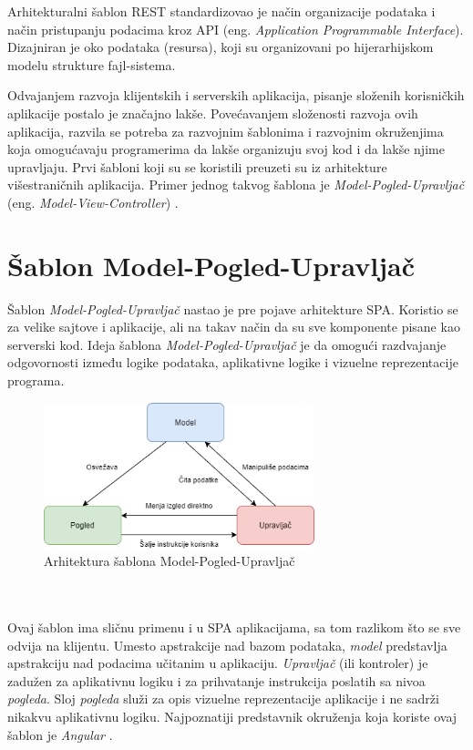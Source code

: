 \documentclass[12pt,oneside]{memoir}
\begin{document}
Arhitekturalni šablon REST standardizovao je način organizacije podataka
i način pristupanju podacima kroz API (eng. \emph{Application Programmable Interface}). 
Dizajniran je oko podataka (resursa), koji su organizovani po hijerarhijskom modelu
strukture fajl-sistema.

Odvajanjem razvoja klijentskih i serverskih aplikacija, pisanje složenih korisničkih aplikacije postalo je značajno lakše.
Povećavanjem složenosti razvoja ovih aplikacija,
razvila se potreba za razvojnim šablonima i razvojnim okruženjima koja omogućavaju
programerima da lakše organizuju svoj kod i da lakše njime upravljaju.
Prvi šabloni koji su se koristili preuzeti su iz arhitekture višestraničnih aplikacija.
Primer jednog takvog šablona je \emph{Model-Pogled-Upravljač} (eng. \emph{Model-View-Controller}) \cite{MVC}. 

\section{Šablon Model-Pogled-Upravljač}

Šablon \emph{Model-Pogled-Upravljač} nastao je pre pojave arhitekture SPA.
Koristio se za velike sajtove i aplikacije, ali na takav način da su sve komponente pisane
kao serverski kod. Ideja šablona \emph{Model-Pogled-Upravljač} je da omogući razdvajanje odgovornosti
između logike podataka, aplikativne logike i vizuelne reprezentacije programa.
\begin{figure}[!ht]
  \centering
  \includegraphics[width=0.7\textwidth]{slike/MVC_pattern (1).png}
  \caption{Arhitektura šablona Model-Pogled-Upravljač}
  \label{fig:MVC}
\end{figure}
\\
\\
Ovaj šablon ima sličnu primenu i u SPA aplikacijama, sa tom razlikom što se sve odvija na klijentu.
Umesto apstrakcije nad bazom podataka, \emph{model} predstavlja apstrakciju nad podacima učitanim
u aplikaciju. \emph{Upravljač} (ili kontroler) je zadužen za aplikativnu logiku i za prihvatanje
instrukcija poslatih sa nivoa \emph{pogleda}. Sloj \emph{pogleda} služi za opis vizuelne
reprezentacije aplikacije i ne sadrži nikakvu aplikativnu logiku. Najpoznatiji predstavnik okruženja
koja koriste ovaj šablon je \emph{Angular} \cite{Angular}.
\end{document}

